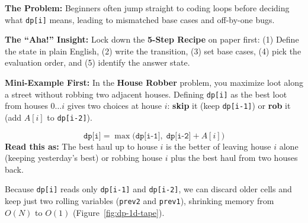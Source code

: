 \documentclass[11pt,a4paper]{article}
\theoremstyle{definition}
\newcommand{\painbeat}{\textbf{\color{accentamber}The Problem:} }
\newcommand{\ahabeat}{\textbf{\color{accentteal}The ``Aha!'' Insight:} }
\newcommand{\examplebeat}{\textbf{\color{primaryblue}Mini-Example First:} }
\begin{document}
\painbeat Beginners often jump straight to coding loops before deciding what \texttt{dp[i]} means, leading to mismatched base cases and off-by-one bugs.

\ahabeat Lock down the \textbf{5-Step Recipe} on paper first: (1) Define the state in plain English, (2) write the transition, (3) set base cases, (4) pick the evaluation order, and (5) identify the answer state.

\examplebeat In the \textbf{House Robber} problem, you maximize loot along a street without robbing two adjacent houses. Defining \texttt{dp[i]} as the best loot from houses $0 \dots i$ gives two choices at house $i$: \textbf{skip} it (keep \texttt{dp[i-1]}) or \textbf{rob} it (add $A[i]$ to \texttt{dp[i-2]}).

\begin{formulabox}
$$\texttt{dp[i]} = \max\big(\texttt{dp[i-1]},\; \texttt{dp[i-2]} + A[i]\big)$$
\textbf{Read this as:} The best haul up to house $i$ is the better of leaving house $i$ alone (keeping yesterday's best) or robbing house $i$ plus the best haul from two houses back.
\end{formulabox}

Because \texttt{dp[i]} reads only \texttt{dp[i-1]} and \texttt{dp[i-2]}, we can discard older cells and keep just two rolling variables (\texttt{prev2} and \texttt{prev1}), shrinking memory from $O(N)$ to $O(1)$ (Figure~\ref{fig:dp-1d-tape}).
\end{document}
